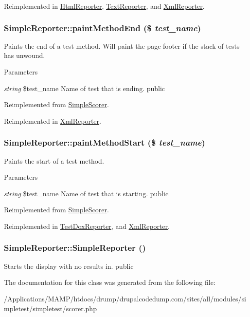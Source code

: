 Reimplemented in \hyperlink{class_html_reporter_a1d579bc4e86295e07da8f4e364092010}{HtmlReporter}, \hyperlink{class_text_reporter_a0ad9d130d152c3fa6a56b65f599f34ca}{TextReporter}, and \hyperlink{class_xml_reporter_abd986228b92ae1f349b23254ad6a8c01}{XmlReporter}.\hypertarget{class_simple_reporter_a0ad8baf509606e35dec1bbefddef3fc0}{
\subsubsection[{paintMethodEnd}]{\setlength{\rightskip}{0pt plus 5cm}SimpleReporter::paintMethodEnd (\$ {\em test\_\-name})}}
\label{class_simple_reporter_a0ad8baf509606e35dec1bbefddef3fc0}
Paints the end of a test method. Will paint the page footer if the stack of tests has unwound. 
\begin{DoxyParams}{Parameters}
\item[{\em string}]\$test\_\-name Name of test that is ending.  public \end{DoxyParams}


Reimplemented from \hyperlink{class_simple_scorer_a419382f8670b1d944f2036bb02dc2800}{SimpleScorer}.

Reimplemented in \hyperlink{class_xml_reporter_ae021130f96f98f7ff693740c331c31ae}{XmlReporter}.\hypertarget{class_simple_reporter_a54672d58e0fad0e0e672159dd4f61124}{
\subsubsection[{paintMethodStart}]{\setlength{\rightskip}{0pt plus 5cm}SimpleReporter::paintMethodStart (\$ {\em test\_\-name})}}
\label{class_simple_reporter_a54672d58e0fad0e0e672159dd4f61124}
Paints the start of a test method. 
\begin{DoxyParams}{Parameters}
\item[{\em string}]\$test\_\-name Name of test that is starting.  public \end{DoxyParams}


Reimplemented from \hyperlink{class_simple_scorer_a1467957d4a23761b8d23d5d0c88b9a89}{SimpleScorer}.

Reimplemented in \hyperlink{class_test_dox_reporter_a1d7d83c7832d12c8626245ec38b80a96}{TestDoxReporter}, and \hyperlink{class_xml_reporter_a9d879c209e50eadfcdbd8e3bfc7ba226}{XmlReporter}.\hypertarget{class_simple_reporter_a7fd4aba19a7aa84b0a099f7d6b532a19}{
\subsubsection[{SimpleReporter}]{\setlength{\rightskip}{0pt plus 5cm}SimpleReporter::SimpleReporter ()}}
\label{class_simple_reporter_a7fd4aba19a7aa84b0a099f7d6b532a19}
Starts the display with no results in.  public 

The documentation for this class was generated from the following file:\begin{DoxyCompactItemize}
\item 
/Applications/MAMP/htdocs/drump/drupalcodedump.com/sites/all/modules/simpletest/simpletest/scorer.php\end{DoxyCompactItemize}
